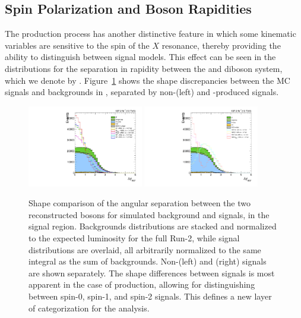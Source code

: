 \subsection{Spin Polarization and Boson Rapidities}
\label{subsec:spinPol}

The \VBF production process has another distinctive feature in which some kinematic variables are sensitive to the spin of the $X$ resonance, thereby providing the ability to distinguish between signal models.
This effect can be seen in the distributions for the separation in rapidity between the \Vhad and \Wlep diboson system, which we denote by \Dy.
Figure~\ref{fig:DyComp} shows the shape discrepancies between the MC signals and backgrounds in \Dy, separated by non-\VBF (left) and \VBF-produced signals.

\begin{figure}[htbp]
  \centering
  \includegraphics[width=0.45\textwidth]{fig/eventSelection/SR_b1_allL_allP_allC_inc_lo_Run2_Dy.pdf}
  \includegraphics[width=0.45\textwidth]{fig/eventSelection/SR_b1_allL_allP_allC_vbf_lo_Run2_Dy.pdf}
  \caption{
    Shape comparison of the angular separation \Dy between the two reconstructed bosons for simulated background and signals, in the signal region.
    Backgrounds distributions are stacked and normalized to the expected luminosity for the full Run-2, while signal distributions are overlaid, all arbitrarily normalized to the same integral as the sum of backgrounds.
    Non-\VBF (left) and \VBF (right) signals are shown separately.
    The shape differences between signals is most apparent in the case of \VBF production, allowing for distinguishing between spin-0, spin-1, and spin-2 signals.
    This defines a new layer of categorization for the analysis.
  }
  \label{fig:DyComp}
\end{figure}

